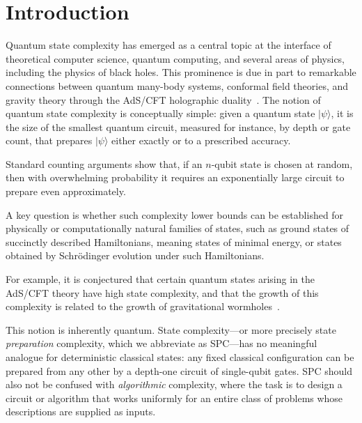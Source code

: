 \documentclass[12pt]{article}
\begin{document}
\tableofcontents


\section{Introduction}
Quantum state complexity has emerged as a central topic at the interface of theoretical computer science, quantum computing, and several areas of physics, including the physics of
black holes. This prominence is due in part to remarkable connections between quantum many-body systems, conformal field theories, and gravity theory through the AdS/CFT holographic duality~\cite{baiguera2026quantum}. The notion of quantum state complexity is conceptually simple: given a quantum state $|\psi\rangle$, it is the size of the smallest quantum circuit, measured for instance, by depth or gate count, that prepares $|\psi\rangle$ either exactly or to a prescribed accuracy.

Standard counting arguments show that, if an $n$-qubit state is chosen at random, then with overwhelming probability it requires an exponentially large circuit to prepare even approximately.

A key question is whether such complexity lower bounds can be established for physically or computationally natural families of states, such as ground states of succinctly described Hamiltonians, meaning states of minimal energy, or states obtained by Schrödinger evolution under such Hamiltonians.

For example, it is conjectured that certain quantum states arising in the AdS/CFT theory have high state complexity, and that the growth of this complexity is related to the growth of gravitational wormholes~\cite{susskind2016computational, baiguera2026quantum}. 

This notion is inherently quantum. State complexity—or more precisely state \emph{preparation} complexity, which we abbreviate as SPC—has no meaningful analogue for deterministic classical states: any fixed classical configuration can be prepared from any other by a depth-one circuit of single-qubit gates. SPC should also not be confused with \emph{algorithmic} complexity, where the task is to design a circuit or algorithm that works uniformly for an entire class of problems whose descriptions are supplied as inputs.
\end{document}
